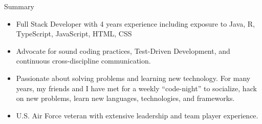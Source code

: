 \documentclass[]{mcdowellcv}
\begin{document}
\makeheader
\begin{cvsection}{Summary}
	\begin{cvsubsection}{}{}{}
		\begin{itemize}
			\item Full Stack Developer with 4 years experience including exposure to Java, R, TypeScript, JavaScript, HTML, CSS
			\item Advocate for sound coding practices, Test-Driven Development, and continuous cross-discipline communication.
			\item  Passionate about solving problems and learning new technology. For many years, my friends and I have met for a weekly \enquote{code-night} to socialize, hack on new problems, learn new languages, technologies, and frameworks.
			\item U.S. Air Force veteran with extensive leadership and team player experience.
		\end{itemize}
	\end{cvsubsection}
\end{cvsection}
\end{document}
